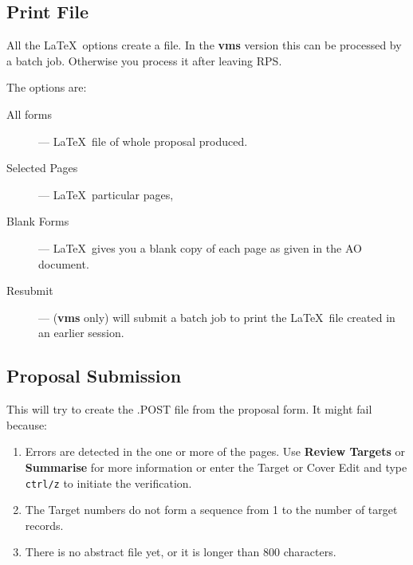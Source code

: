 \subsection{Print File}

All the \LaTeX\ options create a file. In the {\bf vms} version this
can be processed by a batch job. Otherwise you process it after leaving
RPS.

The options are:

\begin{description}
\begin{description}

\item [All forms] --- \LaTeX\ file of whole proposal produced.

\item [Selected Pages] --- \LaTeX\ particular pages,

\item [Blank Forms] --- \LaTeX\ gives you a blank copy of each page
as given in the AO document.

\item [Resubmit] --- ({\bf vms} only) will submit a batch job to print
the \LaTeX\ file created in an earlier session.

\end{description}
\end{description}

\subsection{Proposal Submission}

This will try to create the .POST file from the proposal form. It might
fail because:

\begin{enumerate}

\item Errors are detected in the one or more of the pages. Use {\bf
Review Targets} or {\bf Summarise} for more information or enter the
Target or Cover Edit and type {\tt ctrl/z} to initiate the
verification.

\item The Target numbers do not form a sequence from 1 to the number of
target records.

\item There is no abstract file yet, or it is longer than 800 characters.

\end{enumerate}

